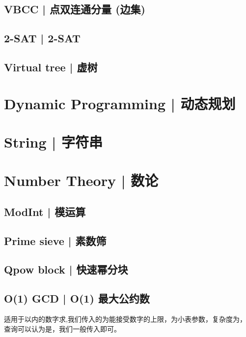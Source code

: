 \documentclass[8pt,a4paper]{article}
\newcommand{\code}[1]{
    
}
\newcommand{\txt}[1]{\par\noindent\footnotesize #1}
\newcommand{\inlineformula}[1]{\ensuremath{}}
\begin{document}
\begin{multicols}{2}
    \subsection{VBCC | 点双连通分量 (边集)}
        \code{src/graph/tarjan_vbcc_edge.cpp}
      
    \subsection{2-SAT | 2-SAT}
        \code{src/graph/2-sat.cpp}
    
    \subsection{Virtual tree | 虚树}
        \code{src/graph/virtual_tree.cpp}

\section{Dynamic Programming | 动态规划}

    

\section{String | 字符串}

    

\section{Number Theory | 数论}

    \subsection{ModInt | 模运算}
        \code{src/number_theory/modint.cpp}

    \subsection{Prime sieve | 素数筛}
        \code{src/number_theory/prime_sieve.cpp}

    \subsection{Qpow block | 快速幂分块}
        \code{src/number_theory/qpow_block.cpp}

    \subsection{O(1) GCD | O(1) 最大公约数}
            \txt{适用于\inlineformula{./assets/formulas_tex/formula_001.tex}以内的数字求\inlineformula{./assets/formulas_tex/formula_002.tex},我们传入的\inlineformula{./assets/formulas_tex/formula_003.tex}为能接受数字的上限，\inlineformula{./assets/formulas_tex/formula_004.tex}为小表参数，复杂度为\inlineformula{./assets/formulas_tex/formula_005.tex}，查询可以认为是\inlineformula{./assets/formulas_tex/formula_006.tex}，我们一般传入\inlineformula{./assets/formulas_tex/formula_007.tex}即可。}
            \code{src/number_theory/O(1)gcd_5.cpp}


\end{multicols}
\end{document}
